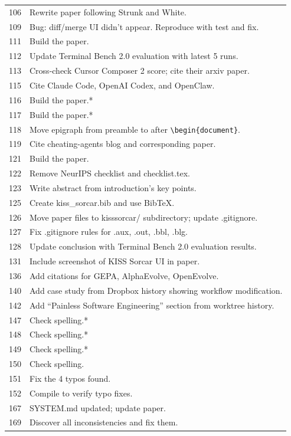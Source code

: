 \documentclass{article}
\begin{document}
\begin{longtable}{rp{}}
106 & Rewrite paper following Strunk and White. \\
109 & Bug: diff/merge UI didn't appear. Reproduce with test and fix. \\
111 & Build the paper. \\
112 & Update Terminal Bench 2.0 evaluation with latest 5 runs. \\
113 & Cross-check Cursor Composer 2 score; cite their arxiv paper. \\
115 & Cite Claude Code, OpenAI Codex, and OpenClaw. \\
116 & Build the paper.* \\
117 & Build the paper.* \\
118 & Move epigraph from preamble to after \texttt{\textbackslash begin\{document\}}. \\
119 & Cite cheating-agents blog and corresponding paper. \\
121 & Build the paper. \\
122 & Remove NeurIPS checklist and checklist.tex. \\
123 & Write abstract from introduction's key points. \\
125 & Create kiss\_sorcar.bib and use BibTeX. \\
126 & Move paper files to kisssorcar/ subdirectory; update .gitignore. \\
127 & Fix .gitignore rules for .aux, .out, .bbl, .blg. \\
128 & Update conclusion with Terminal Bench 2.0 evaluation results. \\
131 & Include screenshot of KISS Sorcar UI in paper. \\
136 & Add citations for GEPA, AlphaEvolve, OpenEvolve. \\
140 & Add case study from Dropbox history showing workflow modification. \\
142 & Add ``Painless Software Engineering'' section from worktree history. \\
147 & Check spelling.* \\
148 & Check spelling.* \\
149 & Check spelling.* \\
150 & Check spelling. \\
151 & Fix the 4 typos found. \\
152 & Compile to verify typo fixes. \\
167 & SYSTEM.md updated; update paper. \\
169 & Discover all inconsistencies and fix them. \\

\end{longtable}
\end{document}
